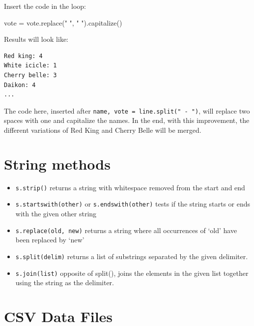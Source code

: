 \documentclass[
  letterpaper,
]{scrbook}
\newenvironment{Shaded}{\begin{snugshade}}{\end{snugshade}}
\newcommand{\NormalTok}[1]{\textcolor[rgb]{0.00,0.23,0.31}{#1}}
\newcommand{\OperatorTok}[1]{\textcolor[rgb]{0.37,0.37,0.37}{#1}}
\newcommand{\StringTok}[1]{\textcolor[rgb]{0.13,0.47,0.30}{#1}}
\providecommand{\tightlist}{%
  \setlength{\itemsep}{0pt}\setlength{\parskip}{0pt}}
\begin{document}
Insert the code in the loop:

\begin{Shaded}
\begin{Highlighting}[]
\NormalTok{vote }\OperatorTok{=}\NormalTok{ vote.replace(}\StringTok{"  "}\NormalTok{, }\StringTok{" "}\NormalTok{).capitalize()}
\end{Highlighting}
\end{Shaded}

Results will look like:

\begin{verbatim}
Red king: 4
White icicle: 1
Cherry belle: 3
Daikon: 4
...
\end{verbatim}

The code here, inserted after
\texttt{name,\ vote\ =\ line.split("\ -\ ")}, will replace two spaces
with one and capitalize the names. In the end, with this improvement,
the different variations of Red King and Cherry Belle will be merged.

\section*{String methods}\label{string-methods}


\begin{itemize}
\tightlist
\item
  \texttt{s.strip()} returns a string with whitespace removed from the
  start and end
\item
  \texttt{s.startswith(\textquotesingle{}other\textquotesingle{})} or
  \texttt{s.endswith(\textquotesingle{}other\textquotesingle{})} tests
  if the string starts or ends with the given other string
\item
  \texttt{s.replace(\textquotesingle{}old\textquotesingle{},\ \textquotesingle{}new\textquotesingle{})}
  returns a string where all occurrences of `old' have been replaced by
  `new'
\item
  \texttt{s.split(\textquotesingle{}delim\textquotesingle{})} returns a
  list of substrings separated by the given delimiter.
\item
  \texttt{s.join(list)} opposite of split(), joins the elements in the
  given list together using the string as the delimiter.
\end{itemize}

\section*{CSV Data Files}\label{csv-data-files}
\end{document}
